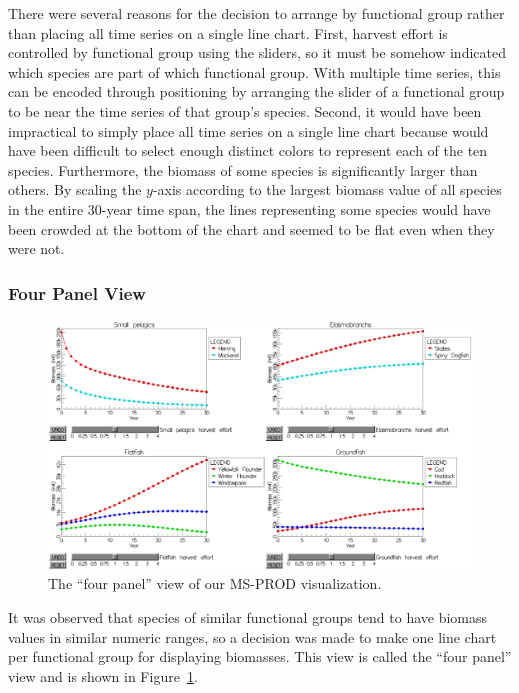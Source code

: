 There were several reasons for the decision to arrange by functional group rather than placing all time series on a single line chart.  First, harvest effort is controlled by functional group using the sliders, so it must be somehow indicated which species are part of which functional group.  With multiple time series, this can be encoded through positioning by arranging the slider of a functional group to be near the time series of that group's species.  Second, it would have been impractical to simply place all time series on a single line chart because would have been difficult to select enough distinct colors to represent each of the ten species.  Furthermore, the biomass of some species is significantly larger than others.  By scaling the $y$-axis according to the largest biomass value of all species in the entire 30-year time span, the lines representing some species would have been crowded at the bottom of the chart and seemed to be flat even when they were not.

\subsubsection{Four Panel View}

\begin{figure}[h]
	\centering
	\includegraphics[width=14cm]{figures/eps/msprod_group.eps}
	\caption{The ``four panel'' view of our MS-PROD visualization.}
	\label{fig:msprod_group}
\end{figure}

It was observed that species of similar functional groups tend to have biomass values in similar numeric ranges, so a decision was made to make one line chart per functional group for displaying biomasses.  This view is called the ``four panel'' view and is shown in Figure~\ref{fig:msprod_group}.

